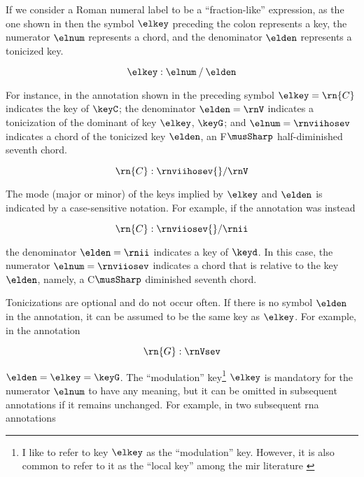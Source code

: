 
If we consider a Roman numeral label to be a
``fraction-like'' expression, as the one shown in
 then the symbol $\elkey$ preceding the
colon represents a key, the numerator $\elnum$ represents a
chord, and the denominator $\elden$ represents a tonicized
key.

\begin{equation}
    \label{eq:rn_expression}
    \elkey : \elnum \: / \: \elden
\end{equation}

For instance, in the annotation shown in 
the preceding symbol $\elkey=\rn{C}$ indicates the key of
$\keyC$; the denominator $\elden = \rnV$ indicates a
tonicization of the dominant of key $\elkey$, $\keyG$; and
$\elnum=\rnviihosev$ indicates a chord of the tonicized key
$\elden$, an F$\musSharp$ half-diminished seventh chord.

\begin{equation}
    \label{eq:rn_example1}
    \rn{C}:\rnviihosev{}/\rnV
\end{equation}


The mode (major or minor) of the keys implied by $\elkey$
and $\elden$ is indicated by a case-sensitive notation. For
example, if the annotation was instead

\begin{equation}
    \rn{C}:\rnviiosev{}/\rnii
\end{equation}

the denominator $\elden=\rnii$ indicates a key of $\keyd$.
In this case, the numerator $\elnum = \rnviiosev$ indicates
a chord that is relative to the key $\elden$, namely, a
C$\musSharp$ diminished seventh chord.

Tonicizations are optional and do not occur often. If there
is no symbol $\elden$ in the annotation, it can be assumed
to be the same key as $\elkey$. For example, in the
annotation

\begin{equation}
    \rn{G}:\rnVsev
\end{equation}

$\elden = \elkey = \keyG$. The ``modulation'' key\footnote{I
like to refer to key $\elkey$ as the ``modulation'' key.
However, it is also common to refer to it as the ``local
key'' among the \gls{mir} literature
\parencite{napoleslopez2020local}} $\elkey$ is mandatory for
the numerator $\elnum$ to have any meaning, but it can be
omitted in subsequent annotations if it remains unchanged.
For example, in two subsequent \gls{rna} annotations

